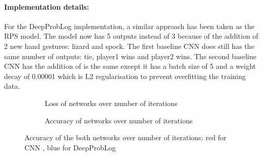 \paragraph{Implementation details:} For the DeepProbLog implementation, a similar approach has been taken as the RPS model. The model now has 5 outputs instead of 3 because of the addition of 2 new hand gestures: lizard and spock. The first baseline CNN does still has the same number of outputs: tie, player1 wins and player2 wins. The second baseline CNN has the addition of is the same except it has a batch size of 5 and a weight decay of 0.00001 which is L2 regularisation to prevent overfitting the training data. 

\begin{figure}[h]
    \centering
    \begin{subfigure}[b]{0.49\textwidth}
        \caption{Loss of networks over number of iterations}
    \end{subfigure}
    \hfill
    \begin{subfigure}[b]{0.49\textwidth}
        \caption{Accuracy of networks over number of iterations}
    \end{subfigure}
    \caption{Accuracy of the both networks over number of iterations: red for CNN , blue for DeepProbLog}
\end{figure}  



